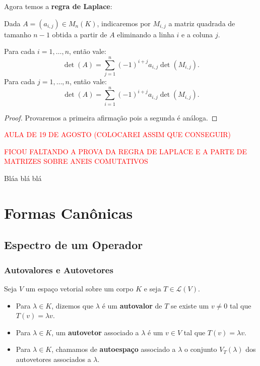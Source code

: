 \documentclass[11pt,twoside,a4paper]{book}
\begin{document}
\noindent
Agora temos a \textbf{regra de Laplace}:

\begin{teorema}
Dada $A=(a_{i,j})\in M_n(K)$, indicaremos por $M_{i,j}$ a matriz quadrada de tamanho $n-1$ obtida a partir de $A$ eliminando a linha $i$ e a coluna $j$.

\smallskip
\noindent
Para cada $i=1,\dots,n$, então vale:
\[
\det(A)=\sum_{j=1}^n(-1)^{i+j}a_{i,j}\det(M_{i,j}).
\]
Para cada $j=1,\dots,n$, então vale:
\[
\det(A)=\sum_{i=1}^n(-1)^{i+j}a_{i,j}\det(M_{i,j}).
\]
\end{teorema}
\begin{proof}
Provaremos a primeira afirmação pois a segunda é análoga.
\end{proof}

\medskip
\noindent
\textcolor{red}{AULA DE 19 DE AGOSTO (COLOCAREI ASSIM QUE CONSEGUIR)}

\medskip
\noindent
\textcolor{red}{FICOU FALTANDO A PROVA DA REGRA DE LAPLACE E A PARTE DE MATRIZES SOBRE ANEIS COMUTATIVOS}

\medskip
\noindent
Bláa blá blá

\chapter{Formas Canônicas}

\section{Espectro de um Operador}

\subsection{Autovalores e Autovetores}

\begin{definicao}
Seja \(V\) um espaço vetorial sobre um corpo \(K\) e seja \(T\in\mathcal{L}(V)\).
\begin{itemize}
\item Para $\lambda\in K$, dizemos que $\lambda$ é um \textbf{autovalor} de $T$ se existe um $v\neq 0$ tal que $T(v)=\lambda v$.
\item Para $\lambda\in K$, um \textbf{autovetor} associado a $\lambda$ é um $v\in V$ tal que $T(v)=\lambda v$.
\item Para $\lambda\in K$, chamamos de \textbf{autoespaço} associado a $\lambda$ o conjunto $V_T(\lambda)$ dos autovetores associados a $\lambda$.
\end{itemize}
\end{definicao}
\end{document}
